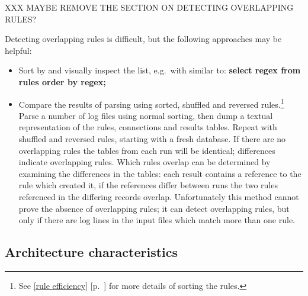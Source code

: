 \documentclass[draft]{svmult}
\newcommand{\refwithpage}[1]{%
    \empty{}\ref{#1} [p.~\pageref{#1}]%
}
\newcommand{\sectionref}[1]{%
    \textsection{}\refwithpage{#1}%
}
\begin{document}
XXX MAYBE REMOVE THE SECTION ON DETECTING OVERLAPPING RULES\@?

Detecting overlapping rules is difficult, but the following approaches may
be helpful:

\begin{itemize}

    \item Sort by \regex{} and visually inspect the list, e.g.\ with \SQL{}
        similar to: \textbf{select regex from rules order by regex;}

    \item Compare the results of parsing using sorted, shuffled and
        reversed rules.\footnote{See \sectionref{rule efficiency} for more
        details of sorting the rules.}  Parse a number of log files using
        normal sorting, then dump a textual representation of the rules,
        connections and results tables.  Repeat with shuffled and reversed
        rules, starting with a fresh database.  If there are no overlapping
        rules the tables from each run will be identical; differences
        indicate overlapping rules.  Which rules overlap can be determined
        by examining the differences in the tables: each result contains a
        reference to the rule which created it, if the references differ
        between runs the two rules referenced in the differing records
        overlap.  Unfortunately this method cannot prove the absence of
        overlapping rules; it can detect overlapping rules, but only if
        there are log lines in the input files which match more than one
        rule.

\end{itemize}




\subsection{Architecture characteristics}

\label{Architecture characteristics}
\end{document}
